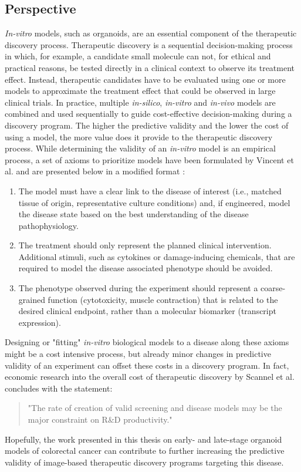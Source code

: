 \begin{flushleft}
\newpage
\clearpage
\section{Perspective}

\textit{In-vitro} models, such as organoids, are an essential component of the therapeutic discovery process. Therapeutic discovery is a sequential decision-making process in which, for example, a candidate small molecule can not, for ethical and practical reasons, be tested directly in a clinical context to observe its treatment effect. Instead, therapeutic candidates have to be evaluated using one or more models to approximate the treatment effect that could be observed in large clinical trials. In practice, multiple \textit{in-silico}, \textit{in-vitro} and \textit{in-vivo} models are combined and used sequentially to guide cost-effective decision-making during a discovery program. The higher the predictive validity and the lower the cost of using a model, the more value does it provide to the therapeutic discovery process. While determining the validity of an \textit{in-vitro} model is an empirical process, a set of axioms to prioritize models have been formulated by Vincent et al. and are presented below in a modified format \parencite{vincentDevelopingPredictiveAssays2015}: 

\begin{enumerate}
    \item The model must have a clear link to the disease of interest (i.e., matched tissue of origin, representative culture conditions) and, if engineered, model the disease state based on the best understanding of the disease pathophysiology.
    \item The treatment should only represent the planned clinical intervention. Additional stimuli, such as cytokines or damage-inducing chemicals, that are required to model the disease associated phenotype should be avoided.
    \item The phenotype observed during the experiment should represent a coarse-grained function (cytotoxicity, muscle contraction) that is related to the desired clinical endpoint, rather than a molecular biomarker (transcript expression).
\end{enumerate}

Designing or "fitting" \textit{in-vitro} biological models to a disease along these axioms might be a cost intensive process, but already minor changes in predictive validity of an experiment can offset these costs in a discovery program. In fact, economic research into the overall cost of therapeutic discovery by Scannel et al. \parencite{scannellWhenQualityBeats2016} concludes with the statement:

\begin{quote}
"The rate of creation of valid screening and disease models may be the major constraint on R\&D productivity."
\end{quote}

Hopefully, the work presented in this thesis on early- and late-stage organoid models of colorectal cancer can contribute to further increasing the predictive validity of image-based therapeutic discovery programs targeting this disease. 
\end{flushleft}